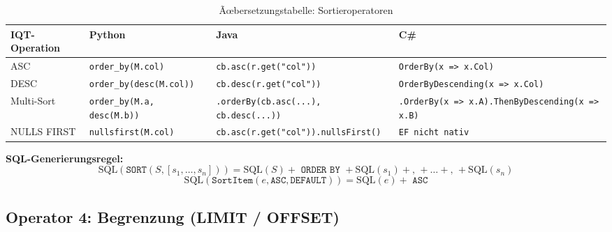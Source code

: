 \begin{table}
\centering
\caption{Ãœbersetzungstabelle: Sortieroperatoren}
\label{tab:sort_ops}
\renewcommand{\arraystretch}{1.4}
\begin{tabularx}{\textwidth}{lXXX}
\toprule
\textbf{IQT-Operation} & \textbf{Python} & \textbf{Java} & \textbf{C\#} \\
\midrule
ASC
  & \texttt{order\_by(M.col)}
  & \texttt{cb.asc(r.get("col"))}
  & \texttt{OrderBy(x => x.Col)} \\
DESC
  & \texttt{order\_by(desc(M.col))}
  & \texttt{cb.desc(r.get("col"))}
  & \texttt{OrderByDescending(x => x.Col)} \\
Multi-Sort
  & \texttt{order\_by(M.a, desc(M.b))}
  & \texttt{.orderBy(cb.asc(...), cb.desc(...))}
  & \texttt{.OrderBy(x => x.A).ThenByDescending(x => x.B)} \\
NULLS FIRST
  & \texttt{nullsfirst(M.col)}
  & \texttt{cb.asc(r.get("col")).nullsFirst()}
  & \texttt{EF nicht nativ} \\
\bottomrule
\end{tabularx}
\end{table}

\textbf{SQL-Generierungsregel:}
\[
\mathrm{SQL}(\mathtt{SORT}(S, [s_1, \ldots, s_n])) =
  \mathrm{SQL}(S) + \texttt{ ORDER BY } +
  \mathrm{SQL}(s_1) + \texttt{, } + \ldots + \texttt{, } + \mathrm{SQL}(s_n)
\]
\[
\mathrm{SQL}(\mathtt{SortItem}(e, \mathtt{ASC}, \mathtt{DEFAULT})) =
  \mathrm{SQL}(e) + \texttt{ ASC}
\]

\subsection{Operator 4: Begrenzung (LIMIT / OFFSET)}
\label{subsec:op_limit}

